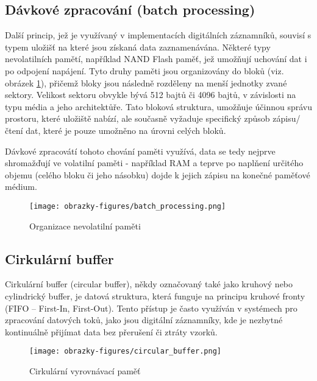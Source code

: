\subsection{Dávkové zpracování (batch processing)}
Další princip, jež je využívaný v implementacích digitálních záznamníků, souvisí s typem uložišť na které jsou získaná data zaznamenávána. Některé typy nevolatilních pamětí, například NAND 
Flash paměť, jež umožňují uchování dat i po odpojení napájení. Tyto druhy paměti jsou organizovány do bloků (viz. obrázek \ref{fig:batch-processing}), přičemž bloky jsou následně rozděleny 
na menší jednotky zvané sektory. Velikost sektoru obvykle bývá 512 bajtů či 4096 bajtů, v závislosti na typu média a jeho architektůře. Tato bloková struktura, umožňuje účinnou správu prostoru, 
které uložiště nabízí, ale současně vyžaduje specifický způsob zápisu/čtení dat, které je pouze umožněno na úrovni celých bloků.  \cite{tech_target_nand_flash, non_volatile_memories}

Dávkové zpracovátí tohoto chování paměti využívá, data se tedy nejprve shromažďují ve volatilní paměti - například RAM a teprve po naplňení určitého objemu (celého bloku či jeho násobku) 
dojde k jejich zápisu na konečné paměťové médium.

\begin{figure}[h]
    \centering
    \texttt{[image: obrazky-figures/batch\_processing.png]}
    
    \caption{Organizace nevolatilní paměti}
    \label{fig:batch-processing}
\end{figure}


\subsection{Cirkulární buffer}
Cirkulární buffer (circular buffer), někdy označovaný také jako kruhový nebo cylindrický buffer, je datová struktura, která funguje na principu kruhové fronty (FIFO – First-In, First-Out). 
Tento přístup je často využíván v systémech pro zpracování datových toků, jako jsou digitální záznamníky, kde je nezbytné kontinuálně přijímat data bez přerušení či ztráty vzorků.


\begin{figure}[h]
    \centering
    \texttt{[image: obrazky-figures/circular\_buffer.png]}
    
    \caption{Cirkulární vyrovnávací paměť}
    \label{fig:circular-buffer}
\end{figure}

